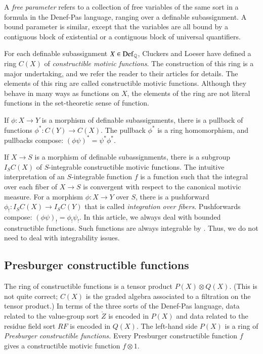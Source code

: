A {\it free parameter} refers to a collection of free variables of the same sort in a formula in the Denef-Pas language, ranging over a definable
subassignment.  A bound parameter is similar, except that the variables are all bound by a contiguous block of existential or
a contiguous block of universal quantifiers.

For each definable subassignment $X\in {\operatorname{Def}}_{\mathbb{Q}}$, Cluckers and Loeser have defined a ring $C(X)$ of 
{\it constructible motivic functions}.  The construction of this ring is a major undertaking, and we refer the reader
to their articles for details.     The elements of this ring are called constructible motivic functions.  Although
they behave in many ways as functions on $X$,  the elements of the ring are not literal functions in the set-theoretic
sense of function.

If $\phi:X\to Y$ is a morphism of definable subassignments, there is a pullback of functions $\phi^*:C(Y)\to C(X)$.  The
pullback $\phi^*$ is a ring homomorphism, and  pullbacks compose: $(\phi\psi)^* = \psi^* \phi^*$.

If $X\to S$ is a morphism of definable subassignments, there is  a subgroup $I_S C(X)$ of $S$-integrable constructible motivic functions.
The intuitive interpretation of an $S$-integrable function $f$ is a function such that the integral over each fiber of $X\to S$ 
is convergent with respect to the canonical motivic measure.  For a morphism $\phi: X\to Y$ over $S$, there is a 
pushforward $\phi_!:I_SC(X)\to I_SC(Y)$ that is called {\it integration over fibers}.  Pushforwards compose: $(\phi\psi)_! = \phi_!\psi_!$.
In this article, we always deal with bounded constructible functions.  Such functions are always integrable by 
\cite[Prop~12.2.2]{cluckers2008constructible}.
Thus, we do not need to deal with integrability issues.

\subsection{Presburger constructible functions}

The ring of constructible functions is a tensor product $P(X) \otimes Q(X)$.  (This is not quite correct; $C(X)$ is the graded
algebra associated to a filtration on the tensor product.)  In terms of the three sorts of the Denef-Pas language,
data related to the value-group sort $\ring{Z}$ is encoded in $P(X)$ and data related to the residue field sort $RF$ is encoded
in $Q(X)$.  The left-hand side $P(X)$ is a ring of {\it Presburger
constructible functions.}  Every Presburger constructible function $f$ gives a constructible motivic function $f\otimes 1$.

